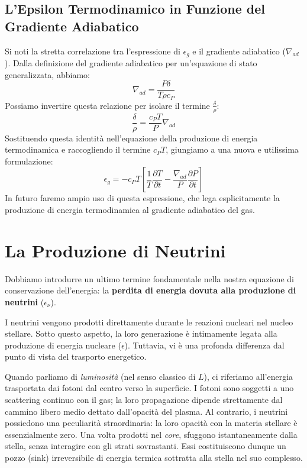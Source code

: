 \subsection{L'Epsilon Termodinamico in Funzione del Gradiente Adiabatico}
Si noti la stretta correlazione tra l'espressione di $\epsilon_g$ e il gradiente adiabatico ($\nabla_{ad}$). Dalla definizione del gradiente adiabatico per un'equazione di stato generalizzata, abbiamo:
\begin{equation}
\nabla_{ad} = \frac{P \delta}{T \rho c_P}
\end{equation}
Possiamo invertire questa relazione per isolare il termine $\frac{\delta}{\rho}$:
\begin{equation}
\frac{\delta}{\rho} = \frac{c_P T}{P} \nabla_{ad}
\end{equation}
Sostituendo questa identità nell'equazione della produzione di energia termodinamica e raccogliendo il termine $c_P T$, giungiamo a una nuova e utilissima formulazione:
\begin{equation}
\epsilon_g = - c_P T \left[ \frac{1}{T} \frac{\partial T}{\partial t} - \frac{\nabla_{ad}}{P} \frac{\partial P}{\partial t} \right]
\end{equation}
In futuro faremo ampio uso di questa espressione, che lega esplicitamente la produzione di energia termodinamica al gradiente adiabatico del gas.

\section{La Produzione di Neutrini}

Dobbiamo introdurre un ultimo termine fondamentale nella nostra equazione di conservazione dell'energia: la \textbf{perdita di energia dovuta alla produzione di neutrini} ($\epsilon_\nu$).

I neutrini vengono prodotti direttamente durante le reazioni nucleari nel nucleo stellare. Sotto questo aspetto, la loro generazione è intimamente legata alla produzione di energia nucleare ($\epsilon$). Tuttavia, vi è una profonda differenza dal punto di vista del trasporto energetico.

Quando parliamo di \textit{luminosità} (nel senso classico di $L$), ci riferiamo all'energia trasportata dai fotoni dal centro verso la superficie. I fotoni sono soggetti a uno scattering continuo con il gas; la loro propagazione dipende strettamente dal cammino libero medio dettato dall'opacità del plasma.
Al contrario, i neutrini possiedono una peculiarità straordinaria: la loro opacità con la materia stellare è essenzialmente zero. Una volta prodotti nel \textit{core}, sfuggono istantaneamente dalla stella, senza interagire con gli strati sovrastanti. Essi costituiscono dunque un pozzo (sink) irreversibile di energia termica sottratta alla stella nel suo complesso.

